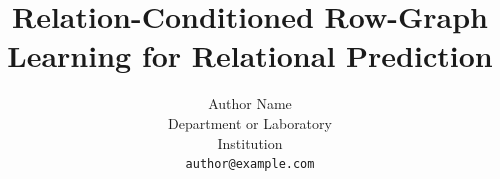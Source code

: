 \documentclass{article}
\title{Relation-Conditioned Row-Graph Learning for Relational Prediction}
\author{%
  Author Name \\
  Department or Laboratory \\
  Institution \\
  \texttt{author@example.com}
}
\begin{document}
\maketitle

\begin{abstract}
  
\end{abstract}




% 
% 
% 





% 

\newpage

\end{document}
